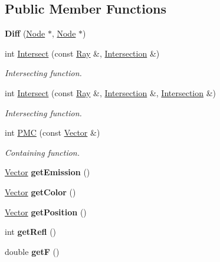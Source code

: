 \subsection*{\-Public \-Member \-Functions}
\begin{DoxyCompactItemize}
\item 
\hypertarget{class_diff_a97d13870f4c698c6242937f91092330e}{
{\bfseries \-Diff} (\hyperlink{class_node}{\-Node} $\ast$, \hyperlink{class_node}{\-Node} $\ast$)}
\label{class_diff_a97d13870f4c698c6242937f91092330e}

\item 
int \hyperlink{class_diff_a9d9ee35accad3efbed3aba5fc9da022c}{\-Intersect} (const \hyperlink{class_ray}{\-Ray} \&, \hyperlink{class_intersection}{\-Intersection} \&)
\begin{DoxyCompactList}\small\item\em \-Intersecting function. \end{DoxyCompactList}\item 
int \hyperlink{class_diff_ad2e06f30b3998b3c9592821e9a037697}{\-Intersect} (const \hyperlink{class_ray}{\-Ray} \&, \hyperlink{class_intersection}{\-Intersection} \&, \hyperlink{class_intersection}{\-Intersection} \&)
\begin{DoxyCompactList}\small\item\em \-Intersecting function. \end{DoxyCompactList}\item 
int \hyperlink{class_diff_a9569764d64e3cc072c554ceffad7934a}{\-P\-M\-C} (const \hyperlink{class_vector}{\-Vector} \&)
\begin{DoxyCompactList}\small\item\em \-Containing function. \end{DoxyCompactList}\item 
\hypertarget{class_diff_a3c7c9dfc158002c877a4ef0aeac30900}{
\hyperlink{class_vector}{\-Vector} {\bfseries get\-Emission} ()}
\label{class_diff_a3c7c9dfc158002c877a4ef0aeac30900}

\item 
\hypertarget{class_diff_afb4a403e4cbc49710fb7b6f570c3fe39}{
\hyperlink{class_vector}{\-Vector} {\bfseries get\-Color} ()}
\label{class_diff_afb4a403e4cbc49710fb7b6f570c3fe39}

\item 
\hypertarget{class_diff_a8c962ee4f6a0df72e7a69322de3210b8}{
\hyperlink{class_vector}{\-Vector} {\bfseries get\-Position} ()}
\label{class_diff_a8c962ee4f6a0df72e7a69322de3210b8}

\item 
\hypertarget{class_diff_ad9c0799bfde75340e584a1ea20d7f564}{
int {\bfseries get\-Refl} ()}
\label{class_diff_ad9c0799bfde75340e584a1ea20d7f564}

\item 
\hypertarget{class_diff_a55bd9230b7be32d4e9a1e20a5ff5df10}{
double {\bfseries get\-F} ()}
\label{class_diff_a55bd9230b7be32d4e9a1e20a5ff5df10}

\end{DoxyCompactItemize}



